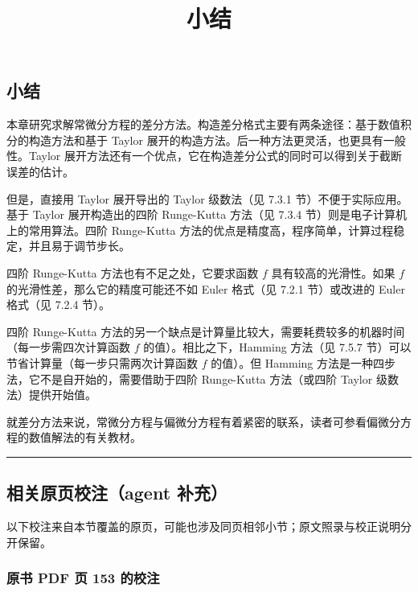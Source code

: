 \documentclass[
  10pt,
  fontset=fandol]{ctexart}
\title{小结}
\author{}
\date{}
\begin{document}
\maketitle

\subsection{小结}\label{ux5c0fux7ed3}

本章研究求解常微分方程的差分方法。构造差分格式主要有两条途径：基于数值积分的构造方法和基于 Taylor 展开的构造方法。后一种方法更灵活，也更具有一般性。Taylor 展开方法还有一个优点，它在构造差分公式的同时可以得到关于截断误差的估计。

但是，直接用 Taylor 展开导出的 Taylor 级数法（见 7.3.1 节）不便于实际应用。基于 Taylor 展开构造出的四阶 Runge-Kutta 方法（见 7.3.4 节）则是电子计算机上的常用算法。四阶 Runge-Kutta 方法的优点是精度高，程序简单，计算过程稳定，并且易于调节步长。

四阶 Runge-Kutta 方法也有不足之处，它要求函数 \(f\) 具有较高的光滑性。如果 \(f\) 的光滑性差，那么它的精度可能还不如 Euler 格式（见 7.2.1 节）或改进的 Euler 格式（见 7.2.4 节）。

四阶 Runge-Kutta 方法的另一个缺点是计算量比较大，需要耗费较多的机器时间（每一步需四次计算函数 \(f\) 的值）。相比之下，Hamming 方法（见 7.5.7 节）可以节省计算量（每一步只需两次计算函数 \(f\) 的值）。但 Hamming 方法是一种四步法，它不是自开始的，需要借助于四阶 Runge-Kutta 方法（或四阶 Taylor 级数法）提供开始值。

就差分方法来说，常微分方程与偏微分方程有着紧密的联系，读者可参看偏微分方程的数值解法的有关教材。

\begin{center}\rule{0.5\linewidth}{0.5pt}\end{center}

\subsection{相关原页校注（agent 补充）}\label{ux76f8ux5173ux539fux9875ux6821ux6ce8agent-ux8865ux5145}

以下校注来自本节覆盖的原页，可能也涉及同页相邻小节；原文照录与校正说明分开保留。

\subsubsection{原书 PDF 页 153 的校注}\label{ux539fux4e66-pdf-ux9875-153-ux7684ux6821ux6ce8}
\end{document}
